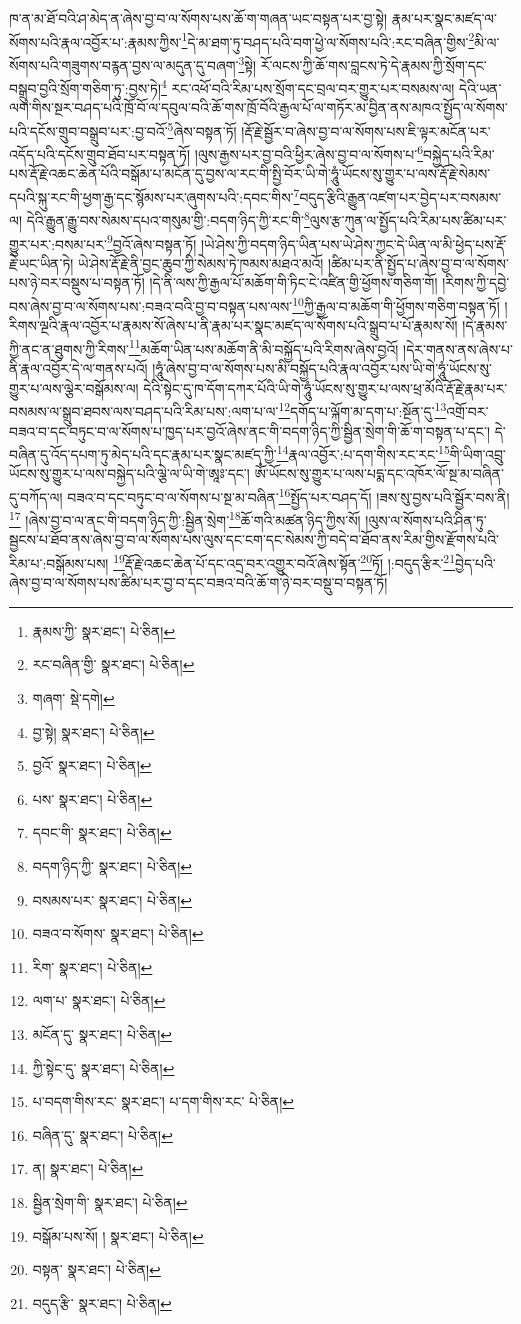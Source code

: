 ཁ་ན་མ་ཐོ་བའི་ཤ་མེད་ན་ཞེས་བྱ་བ་ལ་སོགས་པས་ཆོ་ག་གཞན་ཡང་བསྟན་པར་བྱ་སྟེ། རྣམ་པར་སྣང་མཛད་ལ་སོགས་པའི་རྣལ་འབྱོར་པ་:རྣམས་ཀྱིས་\footnote{རྣམས་ཀྱི་  སྣར་ཐང་།  པེ་ཅིན། }དེ་མ་ཐག་ཏུ་བཤད་པའི་བག་ཕྱེ་ལ་སོགས་པའི་:རང་བཞིན་གྱིས་\footnote{རང་བཞིན་གྱི་  སྣར་ཐང་།  པེ་ཅིན། }མི་ལ་སོགས་པའི་གཟུགས་བརྙན་བྱས་ལ་མདུན་དུ་བཞག་\footnote{གཞག་  སྡེ་དགེ། }སྟེ། རོ་ལངས་ཀྱི་ཆོ་གས་བླངས་ཏེ་དེ་རྣམས་ཀྱི་སྲོག་དང་བསྒྲུབ་བྱའི་སྲོག་གཅིག་ཏུ་:བྱས་ཏེ།\footnote{བྱ་སྟེ།  སྣར་ཐང་།  པེ་ཅིན། } རང་འཕོ་བའི་རིམ་པས་སྲོག་དང་བྲལ་བར་གྱུར་པར་བསམས་ལ། དེའི་ཡན་ལག་གིས་སྔར་བཤད་པའི་ཁྲོ་བོ་ལ་དབུལ་བའི་ཆོ་གས་ཁྲོ་བོའི་རྒྱལ་པོ་ལ་གཏོར་མ་བྱིན་ནས་མཁའ་སྤྱོད་ལ་སོགས་པའི་དངོས་གྲུབ་བསྒྲུབ་པར་:བྱ་བའོ་\footnote{བྱའོ་  སྣར་ཐང་།  པེ་ཅིན། }ཞེས་བསྟན་ཏོ། །རྡོ་རྗེ་སྦྱོར་བ་ཞེས་བྱ་བ་ལ་སོགས་པས་ཇི་ལྟར་མངོན་པར་འདོད་པའི་དངོས་གྲུབ་ཐོབ་པར་བསྟན་ཏོ། །ལུས་རྒྱས་པར་བྱ་བའི་ཕྱིར་ཞེས་བྱ་བ་ལ་སོགས་པ་\footnote{པས་  སྣར་ཐང་།  པེ་ཅིན། }བསྐྱེད་པའི་རིམ་པས་རྡོ་རྗེ་འཆང་ཆེན་པོའི་བསྒོམ་པ་མངོན་དུ་བྱས་ལ་རང་གི་སྤྱི་བོར་ཡི་གེ་ཧཱུཾ་ཡོངས་སུ་གྱུར་པ་ལས་རྡོ་རྗེ་སེམས་དཔའི་སྐུ་རང་གི་ཕྱག་རྒྱ་དང་སྙོམས་པར་ཞུགས་པའི་:དབང་གིས་\footnote{དབང་གི་  སྣར་ཐང་།  པེ་ཅིན། }བདུད་རྩིའི་རྒྱུན་འཛག་པར་བྱེད་པར་བསམས་ལ། དེའི་རྒྱུན་རྒྱུ་བས་སེམས་དཔའ་གསུམ་གྱི་:བདག་ཉིད་ཀྱི་རང་གི་\footnote{བདག་ཉིད་ཀྱི་  སྣར་ཐང་།  པེ་ཅིན། }ལུས་རྩ་ཀུན་ལ་སྤྱོད་པའི་རིམ་པས་ཚིམ་པར་གྱུར་པར་:བསམ་པར་\footnote{བསམས་པར་  སྣར་ཐང་།  པེ་ཅིན། }བྱའོ་ཞེས་བསྟན་ཏོ། །ཡེ་ཤེས་ཀྱི་བདག་ཉིད་ཡིན་པས་ཡེ་ཤེས་ཀྱང་དེ་ཡིན་ལ་མི་ཕྱེད་པས་རྡོ་རྗེ་ཡང་ཡིན་ཏེ། ཡེ་ཤེས་རྡོ་རྗེ་ནི་བྱང་ཆུབ་ཀྱི་སེམས་ཏེ་ཁམས་མཐའ་མའོ། །ཚིམ་པར་ནི་སྤྱོད་པ་ཞེས་བྱ་བ་ལ་སོགས་པས་ཉེ་བར་བསྡུས་པ་བསྟན་ཏོ། །དེ་ནི་ལས་ཀྱི་རྒྱལ་པོ་མཆོག་གི་ཏིང་ངེ་འཛིན་གྱི་ཕྱོགས་གཅིག་གོ། །རིགས་ཀྱི་དབྱེ་བས་ཞེས་བྱ་བ་ལ་སོགས་པས་:བཟའ་བའི་བྱ་བ་བསྟན་པས་ལས་\footnote{བཟའ་བ་སོགས་  སྣར་ཐང་།  པེ་ཅིན། }ཀྱི་རྒྱལ་བ་མཆོག་གི་ཕྱོགས་གཅིག་བསྟན་ཏོ། །རིགས་ལྔའི་རྣལ་འབྱོར་པ་རྣམས་སོ་ཞེས་པ་ནི་རྣམ་པར་སྣང་མཛད་ལ་སོགས་པའི་སྒྲུབ་པ་པོ་རྣམས་སོ། །དེ་རྣམས་ཀྱི་ནང་ན་ཐུགས་ཀྱི་རིགས་\footnote{རིག་  སྣར་ཐང་།  པེ་ཅིན། }མཆོག་ཡིན་པས་མཆོག་ནི་མི་བསྐྱོད་པའི་རིགས་ཞེས་བྱའོ། །དེར་གནས་ནས་ཞེས་པ་ནི་རྣལ་འབྱོར་དེ་ལ་གནས་པའོ། །ཧཱུཾ་ཞེས་བྱ་བ་ལ་སོགས་པས་མི་བསྐྱོད་པའི་རྣལ་འབྱོར་པས་ཡི་གེ་ཧཱུཾ་ཡོངས་སུ་གྱུར་པ་ལས་ལྕེར་བསྒོམས་ལ། དེའི་སྟེང་དུ་ཁ་དོག་དཀར་པོའི་ཡི་གེ་ཧཱུཾ་ཡོངས་སུ་གྱུར་པ་ལས་ཕྲ་མོའི་རྡོ་རྗེ་རྣམ་པར་བསམས་ལ་སྒྲུབ་ཐབས་ལས་བཤད་པའི་རིམ་པས་:ལག་པ་ལ་\footnote{ལག་པ་  སྣར་ཐང་།  པེ་ཅིན། }དགོད་པ་ལྐོག་མ་དག་པ་:སྔོན་དུ་\footnote{མངོན་དུ་  སྣར་ཐང་།  པེ་ཅིན། }འགྲོ་བར་བཟའ་བ་དང་བཏུང་བ་ལ་སོགས་པ་ཁྱད་པར་བྱའོ་ཞེས་ནང་གི་བདག་ཉིད་ཀྱི་སྦྱིན་སྲེག་གི་ཆོ་ག་བསྟན་པ་དང་། དེ་བཞིན་དུ་འོད་དཔག་ཏུ་མེད་པའི་དང་རྣམ་པར་སྣང་མཛད་ཀྱི་\footnote{ཀྱི་སྟེང་དུ་  སྣར་ཐང་།  པེ་ཅིན། }རྣལ་འབྱོར་:པ་དག་གིས་རང་རང་\footnote{པ་བདག་གིས་རང་  སྣར་ཐང་། པ་དག་གིས་རང་  པེ་ཅིན། }གི་ཡིག་འབྲུ་ཡོངས་སུ་གྱུར་པ་ལས་བསྐྱེད་པའི་ལྕེ་ལ་ཡི་གེ་ཨཱཿ་དང་། ཨོཾ་ཡོངས་སུ་གྱུར་པ་ལས་པདྨ་དང་འཁོར་ལོ་སྔ་མ་བཞིན་དུ་བཀོད་ལ། བཟའ་བ་དང་བཏུང་བ་ལ་སོགས་པ་སྔ་མ་བཞིན་\footnote{བཞིན་དུ་  སྣར་ཐང་།  པེ་ཅིན། }སྤྱོད་པར་བཤད་དོ། །ཟས་སུ་བྱས་པའི་སྦྱོར་བས་ནི།\footnote{ན།  སྣར་ཐང་།  པེ་ཅིན། } །ཞེས་བྱ་བ་ལ་ནང་གི་བདག་ཉིད་ཀྱི་:སྦྱིན་སྲེག་\footnote{སྦྱིན་སྲེག་གི་  སྣར་ཐང་།  པེ་ཅིན། }ཆོ་གའི་མཚན་ཉིད་ཀྱིས་སོ། །ལུས་ལ་སོགས་པའི་ཤིན་ཏུ་སྦྱངས་པ་ཐོབ་ནས་ཞེས་བྱ་བ་ལ་སོགས་པས་ལུས་དང་ངག་དང་སེམས་ཀྱི་བདེ་བ་ཐོབ་ནས་རིམ་གྱིས་རྫོགས་པའི་རིམ་པ་:བསྒོམས་པས། \footnote{བསྒོམ་པས་སོ། །   སྣར་ཐང་།  པེ་ཅིན། }རྡོ་རྗེ་འཆང་ཆེན་པོ་དང་འདྲ་བར་འགྱུར་བའོ་ཞེས་སྟོན་\footnote{བསྟན་  སྣར་ཐང་།  པེ་ཅིན། }ཏོ། །:བདུད་རྩིར་\footnote{བདུད་རྩི་  སྣར་ཐང་།  པེ་ཅིན། }བྱེད་པའི་ཞེས་བྱ་བ་ལ་སོགས་པས་ཚིམ་པར་བྱ་བ་དང་བཟའ་བའི་ཆོ་ག་ཉེ་བར་བསྡུ་བ་བསྟན་ཏོ། 